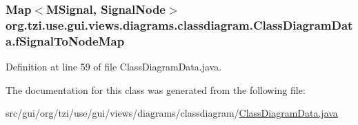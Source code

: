 \hypertarget{classorg_1_1tzi_1_1use_1_1gui_1_1views_1_1diagrams_1_1classdiagram_1_1_class_diagram_data_a58014fb41dc96c6fa514b267c42e27c0}{
\subsubsection[{f\-Signal\-To\-Node\-Map}]{\setlength{\rightskip}{0pt plus 5cm}Map$<${\bf M\-Signal}, {\bf Signal\-Node}$>$ org.\-tzi.\-use.\-gui.\-views.\-diagrams.\-classdiagram.\-Class\-Diagram\-Data.\-f\-Signal\-To\-Node\-Map}}\label{classorg_1_1tzi_1_1use_1_1gui_1_1views_1_1diagrams_1_1classdiagram_1_1_class_diagram_data_a58014fb41dc96c6fa514b267c42e27c0}


Definition at line 59 of file Class\-Diagram\-Data.\-java.



The documentation for this class was generated from the following file\-:\begin{DoxyCompactItemize}
\item 
src/gui/org/tzi/use/gui/views/diagrams/classdiagram/\hyperlink{_class_diagram_data_8java}{Class\-Diagram\-Data.\-java}\end{DoxyCompactItemize}
